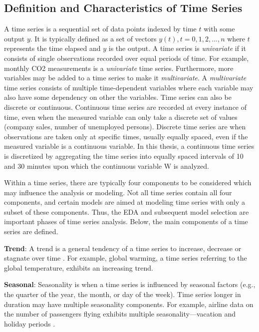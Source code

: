 \subsection{Definition and Characteristics of Time Series}

A time series is a sequential set of data points indexed by time $t$ with some output $y$. It is typically defined as a set of vectors $y(t), t = 0, 1, 2,. . .,n$ where $t$ represents the time elapsed and $y$ is the output. A time series is \textit{univariate} if it consists of single observations recorded over equal periods of time. For example, monthly CO2 measurements is a \textit{univariate} time series. Furthermore, more variables may be added to a time series to make it \textit{multivariate}. A \textit{multivariate} time series consists of multiple time-dependent variables where each variable may also have some dependency on other the variables. Time series can also be discrete or continuous. Continuous time series are recorded at every instance of time, even when the measured variable can only take a discrete set of values (company sales, number of unemployed persons). Discrete time series are when observations are taken only at specific times, usually equally spaced, even if the measured variable is a continuous variable. In this thesis, a continuous time series is discretized by aggregating the time series into equally spaced intervals of 10 and 30 minutes upon which the continuous variable \ac{W} is analyzed. 

Within a time series, there are typically four components to be considered which may influence the analysis or modeling. Not all time series contain all four components, and certain models are aimed at modeling time series with only a subset of these components. Thus, the EDA and subsequent model selection are important phases of time series analysis. Below, the main components of a time series are defined.

\textbf{Trend}: A trend is a general tendency of a time series to increase, decrease or stagnate over time \cite{tsa}. For example, global warming, a time series referring to the global temperature, exhibits an increasing trend. 

\textbf{Seasonal}: Seasonality is when a time series is influenced by seasonal factors (e.g., the quarter of the year, the month, or day of the week). Time series longer in duration may have multiple seasonality components. For example, airline data on the number of passengers flying exhibits multiple seasonality—vacation and holiday periods \cite{tsa}.

